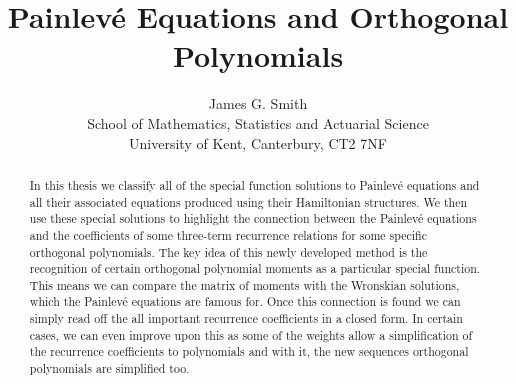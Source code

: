 \documentclass[12pt]{article}
\def\P{Painlev\'e }
\numberwithin{figure}{section}
\numberwithin{equation}{section}
\numberwithin{table}{section}
\begin{document}
\begin{titlepage}
\title{\P Equations and Orthogonal Polynomials}
\author{James G. Smith\\ School of Mathematics, Statistics and Actuarial Science\\ University of Kent, Canterbury, CT2
7NF}
\date{}
\clearpage
\maketitle
\thispagestyle{empty}
\end{titlepage}
\newpage
\begin{abstract}
In this thesis we classify all of the special function solutions to \P equations and all their associated equations produced using their Hamiltonian structures. We then use these special solutions to highlight the connection between the \P equations and the coefficients of some three-term recurrence relations for some specific orthogonal polynomials. The key idea of this newly developed method is the recognition of certain orthogonal polynomial moments as a particular special function. This means we can compare the matrix of moments with the Wronskian solutions, which the \P equations are famous for. Once this connection is found we can simply read off the all important recurrence coefficients in a closed form. In certain cases, we can even improve upon this as some of the weights allow a simplification of the recurrence coefficients to polynomials and with it, the new sequences orthogonal polynomials are simplified too.
\end{abstract}
\newpage
\renewcommand{\abstractname}{Acknowledgements}
\end{document}
